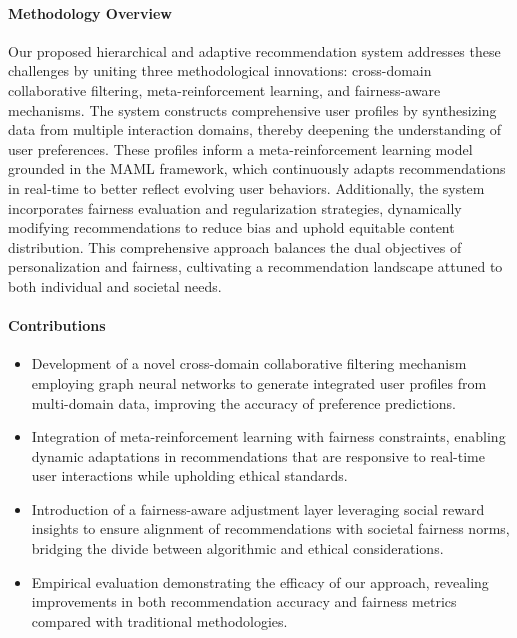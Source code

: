 \paragraph{Methodology Overview}
Our proposed hierarchical and adaptive recommendation system addresses these challenges by uniting three methodological innovations: cross-domain collaborative filtering, meta-reinforcement learning, and fairness-aware mechanisms. The system constructs comprehensive user profiles by synthesizing data from multiple interaction domains, thereby deepening the understanding of user preferences. These profiles inform a meta-reinforcement learning model grounded in the MAML framework, which continuously adapts recommendations in real-time to better reflect evolving user behaviors. Additionally, the system incorporates fairness evaluation and regularization strategies, dynamically modifying recommendations to reduce bias and uphold equitable content distribution. This comprehensive approach balances the dual objectives of personalization and fairness, cultivating a recommendation landscape attuned to both individual and societal needs.

\paragraph{Contributions}
\begin{itemize}
    \item Development of a novel cross-domain collaborative filtering mechanism employing graph neural networks to generate integrated user profiles from multi-domain data, improving the accuracy of preference predictions.
    \item Integration of meta-reinforcement learning with fairness constraints, enabling dynamic adaptations in recommendations that are responsive to real-time user interactions while upholding ethical standards.
    \item Introduction of a fairness-aware adjustment layer leveraging social reward insights to ensure alignment of recommendations with societal fairness norms, bridging the divide between algorithmic and ethical considerations.
    \item Empirical evaluation demonstrating the efficacy of our approach, revealing improvements in both recommendation accuracy and fairness metrics compared with traditional methodologies.
\end{itemize}
